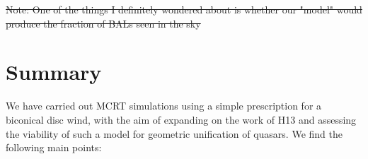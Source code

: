 \documentclass[preprint, a4paper, 11pt]{aastex}
\providecommand{\DIFdel}[1]{{\protect\color{red}\sout{#1}}}                      %
\providecommand{\DIFdelend}{} %
\begin{document}

\DIFdel{Note: One of the things I definitely wondered about is whether our "model" would produce the fraction of BALs seen in the sky}%


\DIFdelend %


\section{Summary}

We have carried out MCRT simulations using a simple
prescription for a biconical disc wind, with
the aim of expanding on the work of H13 and assessing 
the viability of such a model for geometric unification of quasars.
We find the following main points:
\end{document}
